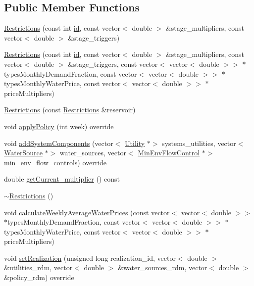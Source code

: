 \subsection*{Public Member Functions}
\begin{DoxyCompactItemize}
\item 
\mbox{\hyperlink{classRestrictions_aec6f37bfaec7d6e22e82945289fd9acc}{Restrictions}} (const int \mbox{\hyperlink{classDroughtMitigationPolicy_abf3ed19ed98e0d74dc9ae24094be640b}{id}}, const vector$<$ double $>$ \&stage\+\_\+multipliers, const vector$<$ double $>$ \&stage\+\_\+triggers)
\item 
\mbox{\hyperlink{classRestrictions_a78083b572f1368bb863d40d7da807077}{Restrictions}} (const int \mbox{\hyperlink{classDroughtMitigationPolicy_abf3ed19ed98e0d74dc9ae24094be640b}{id}}, const vector$<$ double $>$ \&stage\+\_\+multipliers, const vector$<$ double $>$ \&stage\+\_\+triggers, const vector$<$ vector$<$ double $>$$>$ $\ast$types\+Monthly\+Demand\+Fraction, const vector$<$ vector$<$ double $>$$>$ $\ast$types\+Monthly\+Water\+Price, const vector$<$ vector$<$ double $>$$>$ $\ast$price\+Multipliers)
\item 
\mbox{\hyperlink{classRestrictions_aa8653b70ff7eedb4e8fc1b21ebf2ead9}{Restrictions}} (const \mbox{\hyperlink{classRestrictions}{Restrictions}} \&reservoir)
\item 
void \mbox{\hyperlink{classRestrictions_a1ef7559adc034bdddd047ee776b5f9a9}{apply\+Policy}} (int week) override
\item 
void \mbox{\hyperlink{classRestrictions_ab0a2b62495d6cdd8d1fedba419c05c37}{add\+System\+Components}} (vector$<$ \mbox{\hyperlink{classUtility}{Utility}} $\ast$$>$ systems\+\_\+utilities, vector$<$ \mbox{\hyperlink{classWaterSource}{Water\+Source}} $\ast$$>$ water\+\_\+sources, vector$<$ \mbox{\hyperlink{classMinEnvFlowControl}{Min\+Env\+Flow\+Control}} $\ast$$>$ min\+\_\+env\+\_\+flow\+\_\+controls) override
\item 
double \mbox{\hyperlink{classRestrictions_a4282debfe00607f87f59a08ec1844d40}{get\+Current\+\_\+multiplier}} () const
\item 
\mbox{\hyperlink{classRestrictions_a54c8a857a2beed78d34a46c36951b004}{$\sim$\+Restrictions}} ()
\item 
void \mbox{\hyperlink{classRestrictions_a5155dcecc8b995c1793fa400f1533959}{calculate\+Weekly\+Average\+Water\+Prices}} (const vector$<$ vector$<$ double $>$$>$ $\ast$types\+Monthly\+Demand\+Fraction, const vector$<$ vector$<$ double $>$$>$ $\ast$types\+Monthly\+Water\+Price, const vector$<$ vector$<$ double $>$$>$ $\ast$price\+Multipliers)
\item 
void \mbox{\hyperlink{classRestrictions_abc17a8a403311933a3bb58fbecd5f5fd}{set\+Realization}} (unsigned long realization\+\_\+id, vector$<$ double $>$ \&utilities\+\_\+rdm, vector$<$ double $>$ \&water\+\_\+sources\+\_\+rdm, vector$<$ double $>$ \&policy\+\_\+rdm) override
\end{DoxyCompactItemize}
